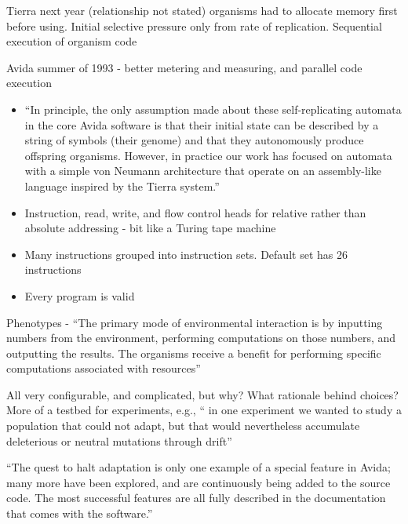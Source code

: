 	Tierra next year (relationship not stated) organisms had to allocate
	memory first before using. Initial selective pressure only from rate
	of replication. Sequential execution of organism code
	

	Avida summer of 1993 - better metering and measuring, and parallel
	code execution
	
	
	\begin{itemize}
		\item
		
		``In principle, the only assumption made about these
		self-replicating automata in the core Avida software is that their
		initial state can be described by a string of symbols (their genome)
		and that they autonomously produce offspring organisms. However, in
		practice our work has focused on automata with a simple von Neumann
		architecture that operate on an assembly-like language inspired by
		the Tierra system.''
		
		\item
		
		Instruction, read, write, and flow control heads for relative rather
		than absolute addressing - bit like a Turing tape machine
		
		\item
		
		Many instructions grouped into instruction sets. Default set has 26
		instructions
		
		\item
		
		Every program is valid
		
	\end{itemize}

	
	Phenotypes - ``The primary mode of environmental interaction is by
	inputting numbers from the environment, performing computations on
	those numbers, and outputting the results. The organisms receive a
	benefit for performing specific computations associated with
	resources''

	All very configurable, and complicated, but why? What rationale behind
	choices? More of a testbed for experiments, e.g., `` in one experiment
	we wanted to study a population that could not adapt, but that would
	nevertheless accumulate deleterious or neutral mutations through
	drift''
	

	``The quest to halt adaptation is only one example of a special
	feature in Avida; many more have been explored, and are continuously
	being added to the source code. The most successful features are all
	fully described in the documentation that comes with the software.''


